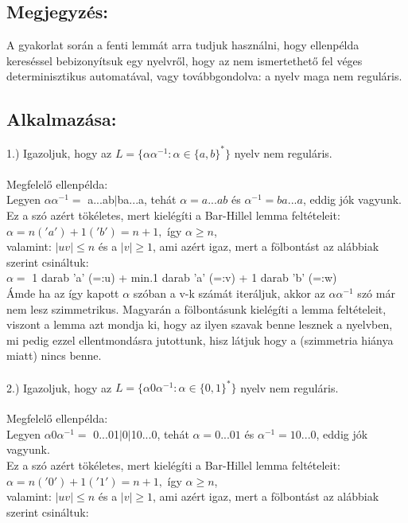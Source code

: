 \documentclass[12pt]{article}
\begin{document}
\subsection{Megjegyzés:}
A gyakorlat során a fenti lemmát arra tudjuk használni, hogy ellenpélda kereséssel bebizonyítsuk egy nyelvről,
hogy az nem ismertethető fel véges determinisztikus automatával, vagy továbbgondolva: a nyelv maga nem reguláris.
\subsection{Alkalmazása:}
1.) Igazoljuk, hogy az $L=\{ \alpha\alpha^{-1}:\alpha\in\{a,b\}^* \}$ nyelv nem reguláris. \\\\
Megfelelő ellenpélda:\\
Legyen $\alpha\alpha^{-1}=$ a...ab$|$ba...a, tehát $\alpha=a...ab$ és $\alpha^{-1}=ba...a$, eddig jók vagyunk.\\
Ez a szó azért tökéletes, mert kielégíti a Bar-Hillel lemma feltételeit:\\
$\alpha = n('a')+1('b') = n+1,$ így $\alpha \geq n$,\\
valamint: $|uv| \leq n$ és a $|v| \geq 1$, ami azért igaz, mert a fölbontást az alábbiak szerint csináltuk:\\
$\alpha=$ 1 darab 'a' (=:u) + min.1 darab 'a' (=:v) + 1 darab 'b' (=:w)\\
Ámde ha az így kapott $\alpha$ szóban a v-k számát iteráljuk, akkor az $\alpha\alpha^{-1}$ szó már nem lesz
szimmetrikus. Magyarán a fölbontásunk kielégíti a lemma feltételeit, viszont a lemma azt mondja ki, hogy
az ilyen szavak benne lesznek a nyelvben, mi pedig ezzel ellentmondásra jutottunk, hisz látjuk hogy a
(szimmetria hiánya miatt) nincs benne.
\\\\
2.) Igazoljuk, hogy az $L=\{ \alpha 0\alpha^{-1}:\alpha\in\{0,1\}^* \}$ nyelv nem reguláris. \\\\
Megfelelő ellenpélda:\\
Legyen $\alpha 0\alpha^{-1}=$ 0...01$|$0$|$10...0, tehát $\alpha=0...01$ és $\alpha^{-1}=10...0$, 
eddig jók vagyunk.\\
Ez a szó azért tökéletes, mert kielégíti a Bar-Hillel lemma feltételeit:\\
$\alpha = n('0')+1('1') = n+1,$ így $\alpha \geq n$,\\
valamint: $|uv| \leq n$ és a $|v| \geq 1$, ami azért igaz, mert a fölbontást az alábbiak szerint csináltuk:\\
\end{document}

